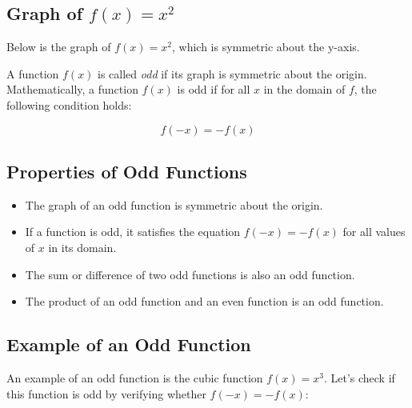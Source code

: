 \subsection*{Graph of \( f(x) = x^2 \)}

Below is the graph of \( f(x) = x^2 \), which is symmetric about the y-axis.

\begin{center}
\end{center}

\begin{definition}
A function \( f(x) \) is called \textit{odd} if its graph is symmetric about the origin. Mathematically, a function \( f(x) \) is odd if for all \( x \) in the domain of \( f \), the following condition holds:

\[
f(-x) = -f(x)
\]

\end{definition}
\subsection{Properties of Odd Functions}
\begin{itemize}
    \item The graph of an odd function is symmetric about the origin.
    \item If a function is odd, it satisfies the equation \( f(-x) = -f(x) \) for all values of \( x \) in its domain.
    \item The sum or difference of two odd functions is also an odd function.
    \item The product of an odd function and an even function is an odd function.
\end{itemize}

\subsection*{Example of an Odd Function}

An example of an odd function is the cubic function \( f(x) = x^3 \). Let’s check if this function is odd by verifying whether \( f(-x) = -f(x) \):

